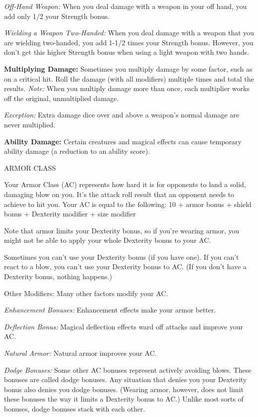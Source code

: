\documentclass{article}
\begin{document}
\textit{Off-Hand Weapon: }When you deal damage with a weapon in your off hand, 
you add only 1/2 your Strength bonus.

\textit{Wielding a Weapon Two-Handed: }When you deal damage with a weapon that 
you are wielding two-handed, you add 1-1/2 times your Strength bonus. However, 
you don't get this higher Strength bonus when using a light weapon with two hands.

\textbf{Multiplying Damage:} Sometimes you multiply damage by some factor, such 
as on a critical hit. Roll the damage (with all modifiers) multiple times and total 
the results. \textit{Note: }When you multiply damage more than once, each multiplier 
works off the original, unmultiplied damage.

\textit{Exception: }Extra damage dice over and above a weapon's normal damage are 
never multiplied.

\textbf{Ability Damage:} Certain creatures and magical effects can cause temporary 
ability damage (a reduction to an ability score).

\vspace{12pt}
ARMOR CLASS

Your Armor Class (AC) represents how hard it is for opponents to land a solid, 
damaging blow on you. It's the attack roll result that an opponent needs to achieve 
to hit you. Your AC is equal to the following: 10 + armor bonus + shield bonus 
+ Dexterity modifier + size modifier

\vspace{12pt}
Note that armor limits your Dexterity bonus, so if you're wearing armor, you might 
not be able to apply your whole Dexterity bonus to your AC.

Sometimes you can't use your Dexterity bonus (if you have one). If you can't react 
to a blow, you can't use your Dexterity bonus to AC. (If you don't have a Dexterity 
bonus, nothing happens.)

\vspace{12pt}
Other Modifiers: Many other factors modify your AC.

\textit{Enhancement Bonuses: }Enhancement effects make your armor better.

\textit{Deflection Bonus: }Magical deflection effects ward off attacks and improve 
your AC.

\textit{Natural Armor: }Natural armor improves your AC.

\textit{Dodge Bonuses: }Some other AC bonuses represent actively avoiding blows. 
These bonuses are called dodge bonuses. Any situation that denies you your Dexterity 
bonus also denies you dodge bonuses. (Wearing armor, however, does not limit these 
bonuses the way it limits a Dexterity bonus to AC.) Unlike most sorts of bonuses, 
dodge bonuses stack with each other.
\end{document}
